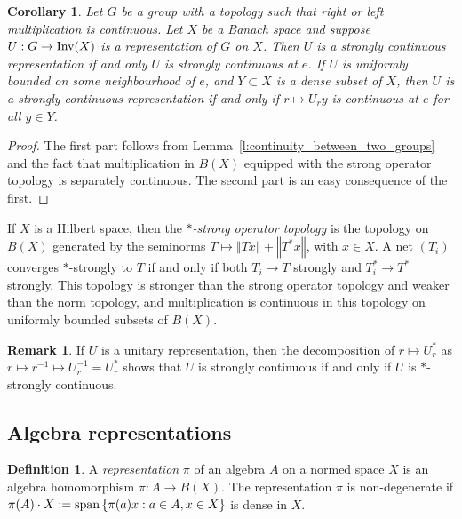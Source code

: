 \documentclass{amsart}
\theoremstyle{plain}
\newtheorem{corol}[theorem]{Corollary}
\theoremstyle{definition}
\newtheorem{defn}[theorem]{Definition}
\newtheorem{remark}[theorem]{Remark}
\numberwithin{equation}{section}
\begin{document}
\begin{corol}\label{c:strongly_continuous_at_e}
Let $G$ be a group with a topology such that right or left multiplication is continuous. Let $X$ be a Banach space and suppose $U:G\to{\textup{Inv}}(X)$ is a representation of $G$ on $X$. Then $U$ is a strongly continuous representation if and only $U$ is strongly continuous at $e$. If $U$ is uniformly bounded on some neighbourhood of $e$, and $Y\subset X$ is a dense subset of $X$, then $U$ is a strongly continuous representation if and only if $r\mapsto U_r y$ is continuous at $e$ for all $y\in Y$.
\end{corol}

\begin{proof}
 The first part follows from Lemma~\ref{l:continuity_between_two_groups} and the fact that multiplication in $B(X)$ equipped with the strong operator topology is separately continuous. The second part is an easy consequence of the first.
\end{proof}

If $X$ is a Hilbert space, then the \emph{$*$-strong operator topology} is the topology on $B(X)$ generated by the seminorms $T \mapsto {\left\Vert {Tx} \right\Vert} + {\left\Vert {T^* x} \right\Vert}$, with $x \in X$. A net $(T_i)$ converges $*$-strongly to $T$ if and only if both $T_i \to T$ strongly and $T_i^* \to T^*$ strongly. This topology is stronger than the strong operator topology and weaker than the norm topology, and multiplication is continuous in this topology on uniformly bounded subsets of $B(X)$.

\begin{remark}\label{r:unitary_is_*-strong-cont}
If $U$ is a unitary representation, then the decomposition of $r \mapsto U_r^*$ as $r \mapsto r^{-1} \mapsto U_r^{-1} = U_r^*$ shows that $U$ is strongly continuous if and only if $U$ is $*$-strongly continuous.
\end{remark}

\subsection{Algebra representations}

\begin{defn}
A \emph{representation} $\pi$ of an algebra $A$ on a normed space $X$ is an algebra homomorphism $\pi: A \to B(X)$. The representation $\pi$ is non-degenerate if $\pi(A)\cdot X:=\textup{span\,}\{\pi(a)x : a\in A,x\in X\}$ is dense in $X$.
\end{defn}
\end{document}
